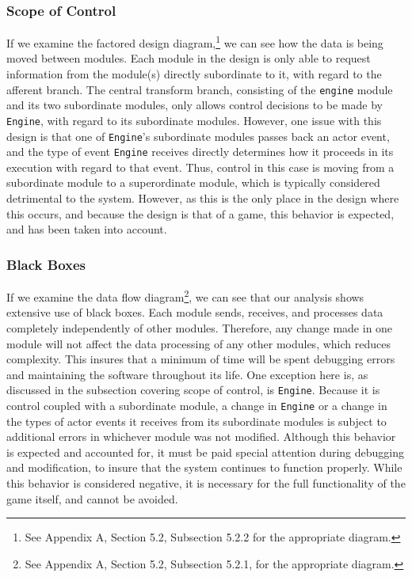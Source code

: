 \documentclass{article}
\begin{document}
		\subsubsection{Scope of Control}
			If we examine the factored design diagram,\footnote{See Appendix A, Section 5.2, Subsection 5.2.2 for the appropriate diagram.} we can see how the data is being moved between modules. Each module in the design is only able to request information from the module(s) directly subordinate to it, with regard to the afferent branch. The central transform branch, consisting of the \texttt{engine} module and its two subordinate modules, only allows control decisions to be made by \texttt{Engine}, with regard to its subordinate modules. However, one issue with this design is that one of \texttt{Engine}'s subordinate modules passes back an actor event, and the type of event \texttt{Engine} receives directly determines how it proceeds in its execution with regard to that event. Thus, control in this case is moving from a subordinate module to a superordinate module, which is typically considered detrimental to the system. However, as this is the only place in the design where this occurs, and because the design is that of a game, this behavior is expected, and has been taken into account. 
		\subsubsection{Black Boxes}
			If we examine the data flow diagram\footnote{See Appendix A, Section 5.2, Subsection 5.2.1, for the appropriate diagram.}, we can see that our analysis shows extensive use of black boxes. Each module sends, receives, and processes data completely independently of other modules. Therefore, any change made in one module will not affect the data processing of any other modules, which reduces complexity. This insures that a minimum of time will be spent debugging errors and maintaining the software throughout its life. One exception here is, as discussed in the subsection covering scope of control, is \texttt{Engine}. Because it is control coupled with a subordinate module, a change in \texttt{Engine} or a change in the types of actor events it receives from its subordinate modules is subject to additional errors in whichever module was not modified. Although this behavior is expected and accounted for, it must be paid special attention during debugging and modification, to insure that the system continues to function properly. While this behavior is considered negative, it is necessary for the full functionality of the game itself, and cannot be avoided.  
\end{document}
